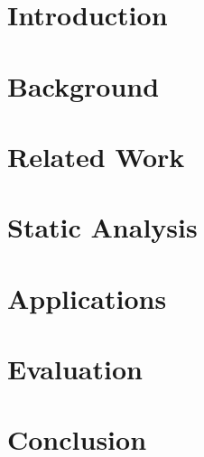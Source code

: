 \documentclass[12pt,a4paper,twoside,openright]{report}
\begin{document}







\afterpage{\blankpage}


\tableofcontents

\clearpage


\chapter{Introduction}



\chapter{Background}



\chapter{Related Work}



\chapter{Static Analysis}



\chapter{Applications}



\chapter{Evaluation}



\chapter{Conclusion}



\printbibliography
\end{document}
